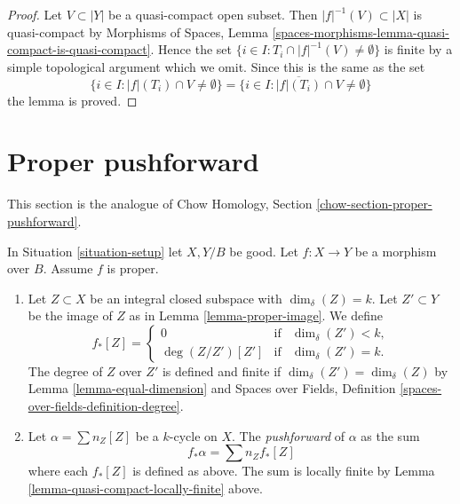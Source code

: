 \begin{proof}
Let $V \subset |Y|$ be a quasi-compact open subset.
Then $|f|^{-1}(V) \subset |X|$ is quasi-compact
by Morphisms of Spaces, Lemma
\ref{spaces-morphisms-lemma-quasi-compact-is-quasi-compact}.
Hence the set
$\{i \in I : T_i \cap |f|^{-1}(V) \not = \emptyset \}$
is finite by a simple topological argument which we omit.
Since this is the same as the set
$$
\{i \in I : |f|(T_i) \cap V \not = \emptyset \} =
\{i \in I : \overline{|f|(T_i)} \cap V \not = \emptyset \}
$$
the lemma is proved.
\end{proof}










\section{Proper pushforward}
\label{section-proper-pushforward}

\noindent
This section is the analogue of
Chow Homology, Section \ref{chow-section-proper-pushforward}.

\begin{definition}
\label{definition-proper-pushforward}
In Situation \ref{situation-setup} let $X, Y/B$ be good.
Let $f : X \to Y$ be a morphism over $B$.
Assume $f$ is proper.
\begin{enumerate}
\item Let $Z \subset X$ be an integral closed subspace
with $\dim_\delta(Z) = k$. Let $Z' \subset Y$ be the
image of $Z$ as in Lemma \ref{lemma-proper-image}.
We define
$$
f_*[Z] =
\left\{
\begin{matrix}
0 & \text{if} & \dim_\delta(Z')< k, \\
\deg(Z/Z') [Z'] & \text{if} & \dim_\delta(Z') = k.
\end{matrix}
\right.
$$
The degree of $Z$ over $Z'$ is defined and finite if
$\dim_\delta(Z') = \dim_\delta(Z)$ by Lemma \ref{lemma-equal-dimension} and
Spaces over Fields, Definition \ref{spaces-over-fields-definition-degree}.
\item Let $\alpha = \sum n_Z [Z]$ be a $k$-cycle on $X$. The
{\it pushforward} of $\alpha$ as the sum
$$
f_* \alpha = \sum n_Z f_*[Z]
$$
where each $f_*[Z]$ is defined as above. The sum is locally finite
by Lemma \ref{lemma-quasi-compact-locally-finite} above.
\end{enumerate}
\end{definition}

